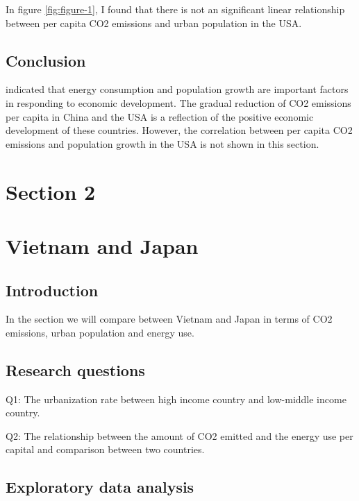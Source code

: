 \documentclass[11pt,a4paper,]{article}
\begin{document}
In figure \ref{fig:figure-1}, I found that there is not an significant linear relationship between per capita CO2 emissions and urban population in the USA.

\hypertarget{conclusion}{%
\subsection{Conclusion}\label{conclusion}}

\textcite{alam2016relationships} indicated that energy consumption and population growth are important factors in responding to economic development. The gradual reduction of CO2 emissions per capita in China and the USA is a reflection of the positive economic development of these countries. However, the correlation between per capita CO2 emissions and population growth in the USA is not shown in this section.

\hypertarget{section-2}{%
\section{Section 2}\label{section-2}}

\section*{Vietnam and Japan}

\hypertarget{introduction-1}{%
\subsection{Introduction}\label{introduction-1}}

In the section we will compare between Vietnam and Japan in terms of CO2 emissions, urban population and energy use.

\hypertarget{research-questions}{%
\subsection{Research questions}\label{research-questions}}

Q1: The urbanization rate between high income country and low-middle income country.

Q2: The relationship between the amount of CO2 emitted and the energy use per capital and comparison between two countries.

\hypertarget{exploratory-data-analysis-1}{%
\subsection{Exploratory data analysis}\label{exploratory-data-analysis-1}}
\end{document}
